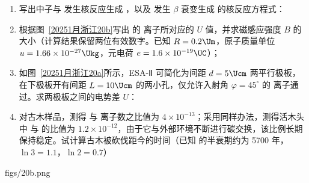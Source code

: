\documentclass[\gkver]{gaokaozhenti}
\begin{document}
\begin{enumerate}
\begin{enumerate}
\item
写出中子与  发生核反应生成 ，以及  发生 $\beta$ 衰变生成  的核反应方程式：

\item
根据图~\ref{20251月浙江20b}写出  的  离子所对应的 $U$ 值，并求磁感应强度 $B$ 的大小（计算结果保留两位有效数字。已知 $R = 0.2 \Um$，原子质量单位 $u = 1.66 \times 10^{-27} \Ukg$，元电荷 $e = 1.6 \times 10^{-19} \UC$）；

\item
如图~\ref{20251月浙江20a}所示，ESA-Ⅱ 可简化为间距 $d = 5 \Ucm$ 两平行极板，在下极板开有间距 $L = 10 \Ucm$ 的两小孔，仅允许入射角 $\varphi = 45^{\circ}$ 的  离子通过。求两极板之间的电势差 $U$：

\item
对古木样品，测得  与  离子数之比值为 $4 \times 10^{-13}$；采用同样办法，测得活木头中  与  的比值为 $1.2 \times 10^{-12}$，由于它与外部环境不断进行碳交换，该比例长期保持稳定。试计算古木被砍伐距今的时间（已知  的半衰期约为 5700 年，$\ln 3 = 1.1$，$\ln 2 = 0.7$）
\end{enumerate}

{figs/20b.png}

\end{enumerate}
\end{document}
